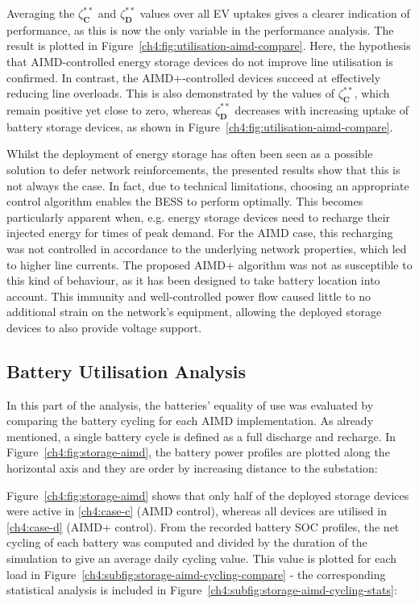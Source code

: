 Averaging the $\zeta_\textbf{C}^{**}$ and $\zeta_\textbf{D}^{**}$ values over all EV uptakes gives a clearer indication of performance, as this is now the only variable in the performance analysis.
The result is plotted in Figure~\ref{ch4:fig:utilisation-aimd-compare}.
Here, the hypothesis that AIMD-controlled energy storage devices do not improve line utilisation is confirmed.
In contrast, the AIMD+-controlled devices succeed at effectively reducing line overloads.
This is also demonstrated by the values of $\zeta_\textbf{C}^{**}$, which remain positive yet close to zero, whereas $\zeta_\textbf{D}^{**}$ decreases with increasing uptake of battery storage devices, as shown in Figure~\ref{ch4:fig:utilisation-aimd-compare}.

Whilst the deployment of energy storage has often been seen as a possible solution to defer network reinforcements, the presented results show that this is not always the case.
In fact, due to technical limitations, choosing an appropriate control algorithm enables the BESS to perform optimally.
This becomes particularly apparent when, e.g. energy storage devices need to recharge their injected energy for times of peak demand.
For the AIMD case, this recharging was not controlled in accordance to the underlying network properties, which led to higher line currents.
The proposed AIMD+ algorithm was not as susceptible to this kind of behaviour, as it has been designed to take battery location into account.
This immunity and well-controlled power flow caused little to no additional strain on the network's equipment, allowing the deployed storage devices to also provide voltage support.

\subsection{Battery Utilisation Analysis}

In this part of the analysis, the batteries' equality of use was evaluated by comparing the battery cycling for each AIMD implementation.
As already mentioned, a single battery cycle is defined as a full discharge and recharge.
In Figure~\ref{ch4:fig:storage-aimd}, the battery power profiles are plotted along the horizontal axis and they are order by increasing distance to the substation:



Figure~\ref{ch4:fig:storage-aimd} shows that only half of the deployed storage devices were active in \ref{ch4:case-c} (AIMD control), whereas all devices are utilised in \ref{ch4:case-d} (AIMD+ control).
From the recorded battery SOC profiles, the net cycling of each battery was computed and divided by the duration of the simulation to give an average daily cycling value.
This value is plotted for each load in Figure~\ref{ch4:subfig:storage-aimd-cycling-compare} - the corresponding statistical analysis is included in Figure~\ref{ch4:subfig:storage-aimd-cycling-stats}:

